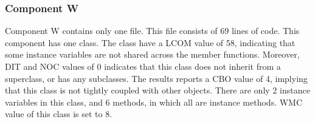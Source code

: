 \begin{table}[]
\end{table}

 

\subsubsection{Component W}
Component W contains only one file. This file consists of 69 lines of code. This component has one class. The class have a LCOM value of 58, indicating that some instance variables are not shared across the member functions. Moreover, DIT and NOC values of 0 indicates that this class does not inherit from a superclass, or has any subclasses. The results reports a CBO value of 4, implying that this class is not tightly coupled with other objects. There are only 2 instance variables in this class, and 6 methods, in which all are instance methods. WMC value of this class is set to 8.




